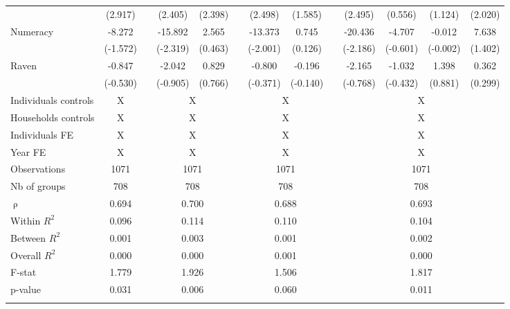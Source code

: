 \begin{table}[htbp]
{\begin{tabular}{lcccccccccccc}
          & (2.917) &       & (2.405) & (2.398) &       & (2.498) & (1.585) &       & (2.495) & (0.556) & (1.124) & (2.020) \\
    Numeracy & -8.272 &       & -15.892 & 2.565 &       & -13.373 & 0.745 &       & -20.436 & -4.707 & -0.012 & 7.638 \\
          & (-1.572) &       & (-2.319) & (0.463) &       & (-2.001) & (0.126) &       & (-2.186) & (-0.601) & (-0.002) & (1.402) \\
    Raven & -0.847 &       & -2.042 & 0.829 &       & -0.800 & -0.196 &       & -2.165 & -1.032 & 1.398 & 0.362 \\
          & (-0.530) &       & (-0.905) & (0.766) &       & (-0.371) & (-0.140) &       & (-0.768) & (-0.432) & (0.881) & (0.299) \\
\cmidrule{1-2}\cmidrule{4-5}\cmidrule{7-8}\cmidrule{10-13}    Individuals controls & X     &       & \multicolumn{2}{c}{X} &       & \multicolumn{2}{c}{X} &       & \multicolumn{4}{c}{X} \\
    Households controls & X     &       & \multicolumn{2}{c}{X} &       & \multicolumn{2}{c}{X} &       & \multicolumn{4}{c}{X} \\
    Individuals FE & X     &       & \multicolumn{2}{c}{X} &       & \multicolumn{2}{c}{X} &       & \multicolumn{4}{c}{X} \\
    Year FE & X     &       & \multicolumn{2}{c}{X} &       & \multicolumn{2}{c}{X} &       & \multicolumn{4}{c}{X} \\
    \midrule
    Observations & 1071  &       & \multicolumn{2}{c}{1071} &       & \multicolumn{2}{c}{1071} &       & \multicolumn{4}{c}{1071} \\
    Nb of groups & 708   &       & \multicolumn{2}{c}{708} &       & \multicolumn{2}{c}{708} &       & \multicolumn{4}{c}{708} \\
    $\uprho$ & 0.694 &       & \multicolumn{2}{c}{0.700} &       & \multicolumn{2}{c}{0.688} &       & \multicolumn{4}{c}{0.693} \\
    Within $R^2$ & 0.096 &       & \multicolumn{2}{c}{0.114} &       & \multicolumn{2}{c}{0.110} &       & \multicolumn{4}{c}{0.104} \\
    Between $R^2$ & 0.001 &       & \multicolumn{2}{c}{0.003} &       & \multicolumn{2}{c}{0.001} &       & \multicolumn{4}{c}{0.002} \\
    Overall $R^2$ & 0.000 &       & \multicolumn{2}{c}{0.000} &       & \multicolumn{2}{c}{0.001} &       & \multicolumn{4}{c}{0.000} \\
    F-stat & 1.779 &       & \multicolumn{2}{c}{1.926} &       & \multicolumn{2}{c}{1.506} &       & \multicolumn{4}{c}{1.817} \\
    p-value & 0.031 &       & \multicolumn{2}{c}{0.006} &       & \multicolumn{2}{c}{0.060} &       & \multicolumn{4}{c}{0.011} \\
    \bottomrule
	\Tablenote{13}{Marginal effects with T-stat in parentheses.} \\
    \end{tabular}%
	}
  \label{tab:ame_loanamount}%
\end{table}%

